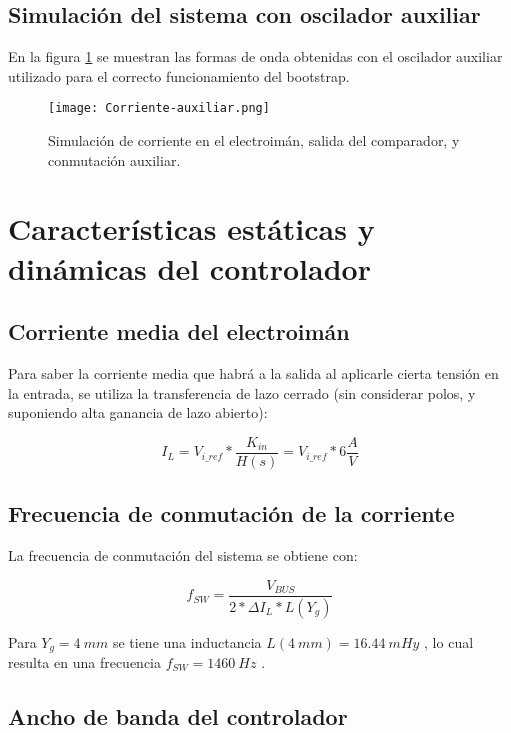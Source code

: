 \subsection{Simulación del sistema con oscilador auxiliar}

\noindent En la figura \ref{fig:img_corriente-auxiliar} se muestran las formas de onda obtenidas con el oscilador auxiliar utilizado para el correcto funcionamiento del bootstrap. 

\begin{figure}[H]
	\centering
	\texttt{[image: Corriente-auxiliar.png]}
	\caption{Simulación de corriente en el electroimán, salida del comparador, y conmutación auxiliar.}
	\label{fig:img_corriente-auxiliar}
\end{figure}

\section{Características estáticas y dinámicas del controlador}

\subsection{Corriente media del electroimán}

\noindent Para saber la corriente media que habrá a la salida al aplicarle cierta tensión en la entrada, se utiliza la transferencia de lazo cerrado (sin considerar polos, y suponiendo alta ganancia de lazo abierto):

\begin{equation} 
	I_L = V_{i\_ref} * \frac{K_{in}}{H(s)} = V_{i\_ref} * 6 \frac{A}{V}
\end{equation}

\subsection{Frecuencia de conmutación de la corriente}

\noindent La frecuencia de conmutación del sistema se obtiene con:

\begin{equation}\label{eq_frec-sw} 
f_{SW} = \frac{V_{BUS}}{2*\Delta I_L * L(Y_g)}
\end{equation}

\noindent Para $Y_g = 4 \:mm $ se tiene una inductancia $L(4\:mm) = 16.44 \:mHy$ , lo cual resulta en una frecuencia $f_{SW }= 1460 \:Hz$ .

\subsection{Ancho de banda del controlador}

